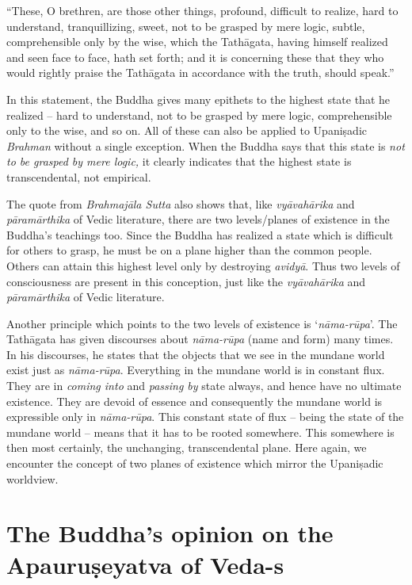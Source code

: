 \begin{myquote}
“These, O brethren, are those other things, profound, difficult to realize, hard to understand, tranquillizing, sweet, not to be grasped by mere logic, subtle, comprehensible only by the wise, which the Tathāgata, having himself realized and seen face to face, hath set forth; and it is concerning these that they who would rightly praise the Tathāgata in accordance with the truth, should speak.”
\end{myquote}

In this statement, the Buddha gives many epithets to the highest state that he realized – hard to understand, not to be grasped by mere logic, comprehensible only to the wise, and so on. All of these can also be applied to Upaniṣadic \textit{Brahman} without a single exception. When the Buddha says that this state is \textit{not to be grasped by mere logic,} it clearly indicates that the highest state is transcendental, not empirical.

The quote from \textit{Brahmajāla Sutta} also shows that, like \textit{vyāvahārika} and \textit{pāramārthika} of Vedic literature, there are two levels/planes of existence in the Buddha’s teachings too. Since the Buddha has realized a state which is difficult for others to grasp, he must be on a plane higher than the common people. Others can attain this highest level only by destroying \textit{avidyā}. Thus two levels of consciousness are present in this conception, just like the \textit{vyāvahārika} and \textit{pāramārthika} of Vedic literature.

Another principle which points to the two levels of existence is ‘\textit{nāma-rūpa}’. The Tathāgata has given discourses about \textit{nāma-rūpa} (name and form) many times. In his discourses, he states that the objects that we see in the mundane world exist just as \textit{nāma-rūpa}. Everything in the mundane world is in constant flux. They are in \textit{coming into} and \textit{passing by} state always, and hence have no ultimate existence. They are devoid of essence and consequently the mundane world is expressible only in \textit{nāma-rūpa}. This constant state of flux – being the state of the mundane world – means that it has to be rooted somewhere. This somewhere is then most certainly, the unchanging, transcendental plane. Here again, we encounter the concept of two planes of existence which mirror the Upaniṣadic worldview.


\section*{The Buddha’s opinion on the Apauruṣeyatva of Veda-s}

